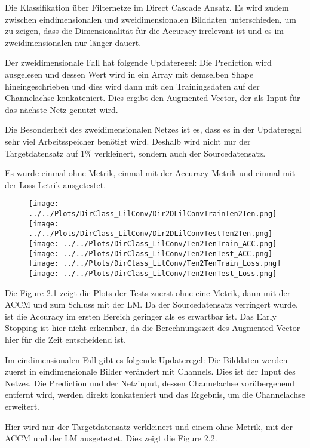 Die Klassifikation über Filternetze im Direct Cascade Ansatz. 
Es wird zudem zwischen eindimensionalen und zweidimensionalen Bilddaten unterschieden, um zu zeigen, dass die Dimensionalität für die 
Accuracy irrelevant ist und es im zweidimensionalen nur länger dauert. 

Der zweidimensionale Fall hat folgende Updateregel: 
Die Prediction wird ausgelesen und dessen Wert wird in ein Array mit demselben Shape hineingeschrieben und dies wird dann mit den Trainingsdaten 
auf der Channelachse konkateniert. Dies ergibt den Augmented Vector, der als Input für das nächste Netz genutzt wird.

Die Besonderheit des zweidimensionalen Netzes ist es, dass es in der Updateregel sehr viel Arbeitsspeicher benötigt wird. Deshalb wird nicht nur 
der Targetdatensatz auf 1\% verkleinert, sondern auch der Sourcedatensatz. 

Es wurde einmal ohne Metrik, einmal mit der Accuracy-Metrik und einmal mit der Loss-Letrik ausgetestet.

\begin{figure}[htpb]
    \texttt{[image: ../../Plots/DirClass\_LilConv/Dir2DLilConvTrainTen2Ten.png]}
    \texttt{[image: ../../Plots/DirClass\_LilConv/Dir2DLilConvTestTen2Ten.png]}
    \texttt{[image: ../../Plots/DirClass\_LilConv/Ten2TenTrain\_ACC.png]}
    \texttt{[image: ../../Plots/DirClass\_LilConv/Ten2TenTest\_ACC.png]}
    \texttt{[image: ../../Plots/DirClass\_LilConv/Ten2TenTrain\_Loss.png]}
    \texttt{[image: ../../Plots/DirClass\_LilConv/Ten2TenTest\_Loss.png]}
    \caption{\label{fig:2dconv}}
\end{figure}

Die Figure 2.1 zeigt die Plots der Tests zuerst ohne eine Metrik, dann mit der ACCM und zum Schluss mit der LM. 
Da der Sourcedatensatz verringert wurde, ist die Accuracy im ersten Bereich geringer als es erwartbar ist. 
Das Early Stopping ist hier nicht erkennbar, da die Berechnungszeit des Augmented Vector hier für die Zeit entscheidend ist.

Im eindimensionalen Fall gibt es folgende Updateregel: 
Die Bilddaten werden zuerst in eindimensionale Bilder verändert mit Channels. Dies ist der Input des Netzes. Die Prediction und der Netzinput, 
dessen Channelachse vorübergehend entfernt wird, werden direkt konkateniert und das Ergebnis, um die Channelachse erweitert. 

Hier wird nur der Targetdatensatz verkleinert und einem ohne Metrik, mit der ACCM und der LM ausgetestet. Dies zeigt die Figure 2.2.

